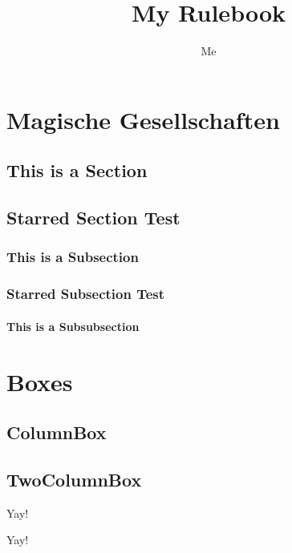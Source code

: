 \documentclass{ShadowTeXSR5}
\title{My Rulebook}
\author{Me}
\begin{document}
\srmaketitle
\tableofcontents


\chapter{Magische Gesellschaften}
\lipsum
\lipsum
\section{This is a Section}
\lipsum[1]
\section*{Starred Section Test}
\lipsum[2]
\subsection{This is a Subsection}
\lipsum[2-5]
\subsection*{Starred Subsection Test}
\lipsum[1-4]
\subsubsection{This is a Subsubsection}
\lipsum
\chapter{Boxes}
\lipsum
\lipsum
\section{ColumnBox}
\lipsum[1]
\begin{columnbox}[l]
\lipsum[1]
\end{columnbox}
\section{TwoColumnBox}
\lipsum
\begin{twocolbox}
\centering\Huge Yay!\\
\normalsize\lipsum[1-3]
\end{twocolbox}
\lipsum
\begin{twocolbox}
\centering\Huge Yay!\\
\normalsize\lipsum[1-3]
\end{twocolbox}
\lipsum
\lipsum
\lipsum
\end{document}
